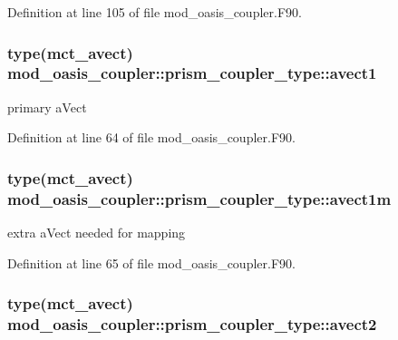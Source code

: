Definition at line 105 of file mod\+\_\+oasis\+\_\+coupler.\+F90.

\hypertarget{structmod__oasis__coupler_1_1prism__coupler__type_a153e0bf9e28c0a8ff4d8bb27c83f598e}{
\subsubsection[{avect1}]{\setlength{\rightskip}{0pt plus 5cm}type(mct\+\_\+avect) mod\+\_\+oasis\+\_\+coupler\+::prism\+\_\+coupler\+\_\+type\+::avect1\hspace{0.3cm}{\ttfamily [private]}}}\label{structmod__oasis__coupler_1_1prism__coupler__type_a153e0bf9e28c0a8ff4d8bb27c83f598e}


primary a\+Vect 



Definition at line 64 of file mod\+\_\+oasis\+\_\+coupler.\+F90.

\hypertarget{structmod__oasis__coupler_1_1prism__coupler__type_ab5626722caee601622658134916f12bf}{
\subsubsection[{avect1m}]{\setlength{\rightskip}{0pt plus 5cm}type(mct\+\_\+avect) mod\+\_\+oasis\+\_\+coupler\+::prism\+\_\+coupler\+\_\+type\+::avect1m\hspace{0.3cm}{\ttfamily [private]}}}\label{structmod__oasis__coupler_1_1prism__coupler__type_ab5626722caee601622658134916f12bf}


extra a\+Vect needed for mapping 



Definition at line 65 of file mod\+\_\+oasis\+\_\+coupler.\+F90.

\hypertarget{structmod__oasis__coupler_1_1prism__coupler__type_a7cd1aa8e520cf036f4dd72ad2445b774}{
\subsubsection[{avect2}]{\setlength{\rightskip}{0pt plus 5cm}type(mct\+\_\+avect) mod\+\_\+oasis\+\_\+coupler\+::prism\+\_\+coupler\+\_\+type\+::avect2\hspace{0.3cm}{\ttfamily [private]}}}\label{structmod__oasis__coupler_1_1prism__coupler__type_a7cd1aa8e520cf036f4dd72ad2445b774}


